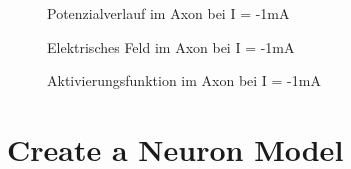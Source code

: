 \documentclass[conference]{IEEEtran}
\begin{document}
\begin{enumerate}
\begin{figure}[h!]
  	\centering
    \scalebox{.6}{}
    \vspace{-10pt}
    \caption{Potenzialverlauf im Axon bei I = -1mA}
    \vspace{-10pt}
    \label{fig:Phi2}
\end{figure}
\begin{figure}[h!]
  	\centering
    \scalebox{.6}{}
    \vspace{-10pt}
    \caption{Elektrisches Feld im Axon bei I = -1mA}
    \vspace{-10pt}
    \label{fig:E2}
\end{figure}
\begin{figure}[h!]
  	\centering
    \scalebox{.6}{}
    \vspace{-10pt}
    \caption{Aktivierungsfunktion im Axon bei I = -1mA}
    \vspace{-10pt}
    \label{fig:A2}
\end{figure}

\end{enumerate}

\pagebreak

\newpage
\vspace{30pt}
\section{Create a Neuron Model}
\end{document}
